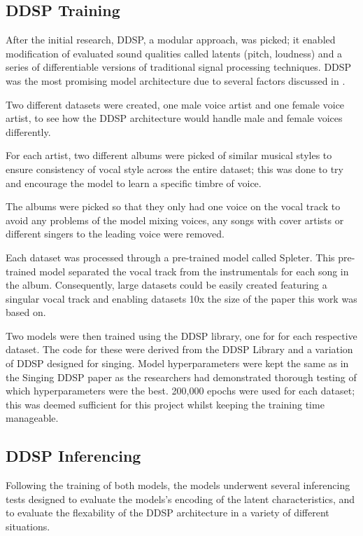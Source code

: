 \subsection{DDSP Training}

After the initial research, DDSP, a modular approach, was picked; it enabled modification of evaluated sound qualities called latents (pitch, loudness) and a series of differentiable versions of traditional signal processing techniques. DDSP was the most promising model architecture due to several factors discussed in .

Two different datasets were created, one male voice artist and one female voice artist, to see how the DDSP architecture would handle male and female voices differently.

For each artist, two different albums were picked of similar musical styles to ensure consistency of vocal style across the entire dataset; this was done to try and encourage the model to learn a specific timbre of voice.

The albums were picked so that they only had one voice on the vocal track to avoid any problems of the model mixing voices, any songs with cover artists or different singers to the leading voice were removed.

Each dataset was processed through a pre-trained model called Spleter\cite{Spleeter}. This pre-trained model separated the vocal track from the instrumentals for each song in the album. Consequently, large datasets could be easily created featuring a singular vocal track and enabling datasets 10x the size of the paper this work was based on\cite{SingingDDSP}.

Two models were then trained using the DDSP library\cite{DDSPPip}, one for for each respective dataset. The code for these were derived from the DDSP Library and a variation of DDSP designed for singing\cite{SingingDDSP}. Model hyperparameters were kept the same as in the Singing DDSP paper\cite{SingingDDSP} as the researchers had demonstrated thorough testing of which hyperparameters were the best. 200,000 epochs were used for each dataset; this was deemed sufficient for this project whilst keeping the training time manageable.

\subsection{DDSP Inferencing}

Following the training of both models, the models underwent several inferencing tests designed to evaluate the models's encoding of the latent characteristics, and to evaluate the flexability of the DDSP architecture in a variety of different situations.

